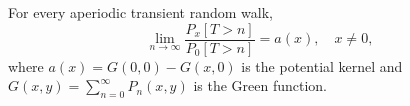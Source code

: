 For every aperiodic transient random walk,
$$\lim_{n \to \infty} \frac{P_x[T > n]}{P_0[T > n]} = a(x), \quad x \neq 0,$$
where $a(x) = G(0,0) - G(x,0)$ is the potential kernel and $G(x,y) = \sum_{n=0}^{\infty} P_n(x,y)$ is the Green function.
